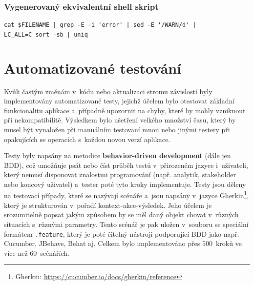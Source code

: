 \subsubsection*{Vygenerovaný ekvivalentní shell skript}
\begin{verbatim}
cat $FILENAME | grep -E -i 'error' | sed -E '/WARN/d' | 
LC_ALL=C sort -sb | uniq
\end{verbatim}

\section{Automatizované testování}
\label{sec:Automatické testování}
Kvůli častým změnám v~kódu nebo aktualizaci stromu závislostí byly implementovány automatizované testy, jejichž účelem bylo otestovat základní funkcionalitu aplikace a~případně upozornit na chyby, které by mohly vzniknout při nekompatibilitě. Výsledkem bylo ušetření velkého množství času, který by musel být vynaložen při manuálním testovaní mnou nebo jinými testery při opakujících se operacích s~každou novou verzí aplikace.

Testy \cite{website:BDD} byly napsány na metodice \textbf{behavior-driven development} (dále jen BDD), což umožňuje psát nebo číst průběh testů v~přirozeném jazyce i~uživateli, který nemusí disponovat znalostmi programování (např. analytik, stakeholder nebo koncový uživatel) a~tester poté tyto kroky implementuje. Testy jsou děleny na testovací případy, které se nazývají scénáře a~jsou napsány v~jazyce Gherkin\footnote{Gherkin: \url{https://cucumber.io/docs/gherkin/reference}}, který je strukturován v~pořadí kontext-akce-výsledek. Jeho účelem je srozumitelně popsat jakým způsobem by se měl daný objekt chovat v~různých situacích s~různými parametry. Tento scénář je pak uložen v~souboru se speciální formátem \texttt{.feature}, který je poté čitelný nástroji podporující BDD jako např. Cucumber, JBehave, Behat aj. Celkem bylo implementováno přes $500$~kroků ve více než $60$~scénářích.


